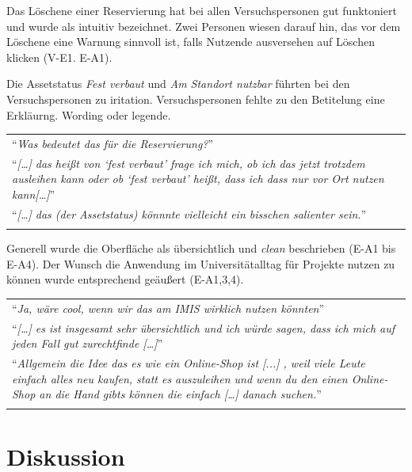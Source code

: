 Das Löschene einer Reservierung hat bei allen Versuchspersonen gut funktoniert und wurde als
intuitiv bezeichnet. Zwei Personen wiesen darauf hin, das vor dem Löschene eine Warnung sinnvoll ist,
falls Nutzende ausversehen auf Löschen klicken (V-E1. E-A1). 

Die Assetstatus \textit{Fest verbaut} und \textit{Am Standort nutzbar} führten bei den
Versuchspersonen zu iritation. Versuchspersonen fehlte zu den Betitelung eine Erkläurng.  Wording
oder legende.

\begin{longtable}{p{}} \arrayrulecolor{maincolor}\hline
  \enquote{\textit{Was bedeutet das für die Reservierung?}} \\
  \enquote{\textit{[\dots] das heißt von \enquote{fest verbaut} frage ich mich, ob ich das jetzt
  trotzdem ausleihen kann oder ob \enquote{fest verbaut} heißt, dass ich dass nur vor Ort nutzen
  kann[\dots]}} \\
  \enquote{\textit{[\dots] das (der Assetstatus) könnnte vielleicht ein bisschen salienter sein.}}
  \\
  \arrayrulecolor{maincolor}\hline
\end{longtable}

Generell wurde die Oberfläche als übersichtlich und \textit{clean} beschrieben (E-A1 bis E-A4). Der
Wunsch die Anwendung im Universitätalltag für Projekte nutzen zu können wurde entsprechend geäußert
(E-A1,3,4).

\begin{longtable}{p{}} \arrayrulecolor{maincolor}\hline
  \enquote{\textit{Ja, wäre cool, wenn wir das am IMIS wirklich nutzen könnten}}\\
  \enquote{\textit{[\dots] es ist insgesamt sehr übersichtlich und ich würde sagen, dass ich mich
  auf jeden Fall gut zurechtfinde [\dots]}} \\
  \enquote{\textit{Allgemein die Idee das es wie ein Online-Shop ist [...] , weil viele Leute
  einfach alles neu kaufen, statt es auszuleihen und wenn du den einen Online-Shop an die Hand gibts
  können die einfach [\dots] danach suchen.}} \\
  \arrayrulecolor{maincolor}\hline
\end{longtable}



\section{Diskussion}